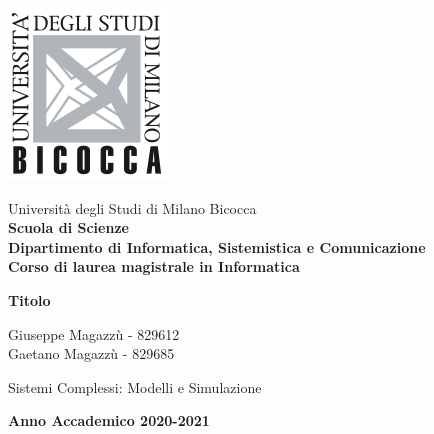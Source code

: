 \begin{titlepage}

\begingroup
\begin{varwidth}{0.2\textwidth}%
  \vspace{-4mm}
  \includegraphics[scale=0.45]{images/logo.png}
\end{varwidth}%
\hspace{2mm}%
\begin{varwidth}{0.8\textwidth}
  \raggedright
  Università degli Studi di Milano Bicocca \\
  \small\bf
  Scuola di Scienze \\
  Dipartimento di Informatica, Sistemistica e Comunicazione \\
  Corso di laurea magistrale in Informatica \\
\end{varwidth}
\endgroup

\center

\vspace{50mm}

\huge{\textbf{Titolo}}

\vspace{50mm}

\large

Giuseppe Magazzù - 829612 \\
Gaetano Magazzù - 829685 \\

\vspace{25mm}

Sistemi Complessi: Modelli e Simulazione

\vspace{8mm}

\textbf{Anno Accademico 2020-2021}

\restoregeometry

\end{titlepage}
